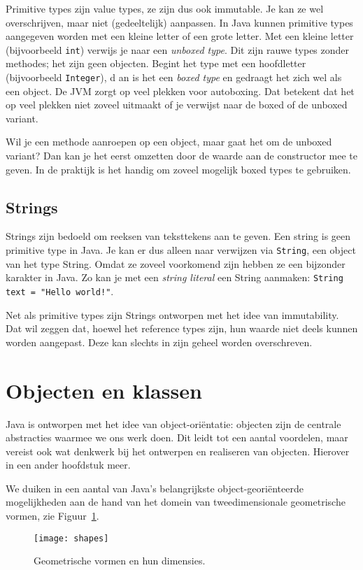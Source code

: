 Primitive types zijn value types, ze zijn dus ook immutable. Je kan ze wel 
overschrijven, maar niet (gedeeltelijk) aanpassen. 
In Java kunnen primitive types aangegeven worden met een kleine letter of een 
grote letter. Met een kleine letter (bijvoorbeeld \texttt{int}) 
verwijs je naar een \textit{unboxed type}. 
Dit zijn rauwe types zonder methodes; het zijn geen objecten.
Begint het type met een hoofdletter (bijvoorbeeld \texttt{Integer}), d
an is het een \textit{boxed type} en 
gedraagt het zich wel als een object. De JVM zorgt op veel plekken voor 
autoboxing. Dat betekent dat het op veel plekken niet zoveel uitmaakt of je 
verwijst naar de boxed of de unboxed variant. 

Wil je een methode aanroepen op 
een object, maar gaat het om de unboxed variant? Dan kan je het eerst omzetten 
door de waarde aan de constructor mee te geven. In de praktijk is het handig om 
zoveel mogelijk boxed types te gebruiken.

\subsection{Strings}
Strings zijn bedoeld om reeksen van teksttekens aan te geven.
Een string is geen primitive type in Java. Je kan er dus alleen 
naar verwijzen via \texttt{String}, een object van het type String. 
Omdat ze zoveel voorkomend zijn hebben ze een bijzonder karakter in Java. 
Zo kan je met een \textit{string literal} een String aanmaken:
\texttt{String text = "Hello world!"}. 

Net als primitive types zijn Strings ontworpen met het idee van 
immutability. Dat wil zeggen dat, hoewel het reference types zijn, hun waarde 
niet deels kunnen worden aangepast. Deze kan slechts in zijn geheel worden 
overschreven.

\section{Objecten en klassen}
Java is ontworpen met het idee van object-oriëntatie:
objecten zijn de centrale abstracties waarmee we ons werk doen.
Dit leidt tot een aantal voordelen, maar vereist ook wat denkwerk
bij het ontwerpen en realiseren van objecten. Hierover in een ander hoofdstuk meer.

We duiken in een aantal van Java's belangrijkste object-georiënteerde mogelijkheden
aan de hand van het domein van tweedimensionale geometrische vormen, zie Figuur~\ref{fig:shapes}.
\begin{figure}[H]
    \centering
    \texttt{[image: shapes]}
    \caption{Geometrische vormen en hun dimensies.}
    \label{fig:shapes}
\end{figure}


